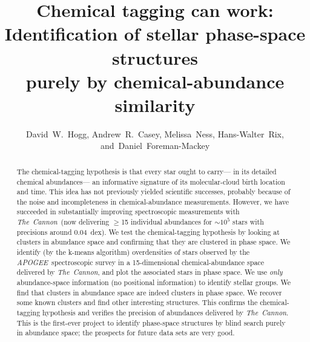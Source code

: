 \documentclass[12pt, letterpaper, preprint]{aastex}
\newcommand{\acronym}[1]{{\small{#1}}}
\newcommand{\project}[1]{\textsl{#1}}
\newcommand{\apogee}{\project{\acronym{APOGEE}}}
\newcommand{\thecannon}{\project{The~Cannon}}
\begin{document}
\sloppy\sloppypar

\title{Chemical tagging can work: \\
       Identification of stellar phase-space structures \\
       purely by chemical-abundance similarity}
\author{David~W.~Hogg,
        Andrew~R.~Casey,
        Melissa~Ness,
        Hans-Walter~Rix,
    and~Daniel~Foreman-Mackey}

\begin{abstract}
The chemical-tagging hypothesis is that every star ought to carry---%
in its detailed chemical abundances---%
an informative signature of its molecular-cloud birth location and time.
This idea has not previously yielded scientific successes, probably because of the
noise and incompleteness in chemical-abundance measurements.
However, we have succeeded in substantially improving spectroscopic measurements with \thecannon\ 
(now delivering $\geq$15 individual abundances for $\sim10^5$ stars with precisions around 0.04~dex).
We test the chemical-tagging hypothesis by looking at clusters in abundance space
and confirming that they are clustered in phase space.
We identify (by the k-means algorithm) overdensities of stars observed by the \apogee\ spectroscopic survey
in a 15-dimensional chemical-abundance space delivered by \thecannon,
and plot the associated stars in phase space.
We use \emph{only} abundance-space information (no positional information) to identify stellar groups.
We find that clusters in abundance space are indeed clusters in phase space.
We recover some known clusters and find other interesting structures.
This confirms the chemical-tagging hypothesis and verifies the precision of abundances delivered by \thecannon.
This is the first-ever project to identify phase-space structures by blind search purely in abundance space;
the prospects for future data sets are very good.
\end{abstract}
\end{document}
